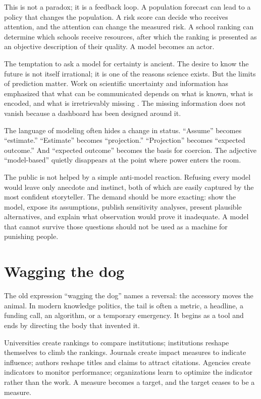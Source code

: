 ﻿\documentclass[12pt,a4paper]{book}
\begin{document}
This is not a paradox; it is a feedback loop. A population forecast can lead
to a policy that changes the population. A risk score can decide who receives
attention, and the attention can change the measured risk. A school ranking
can determine which schools receive resources, after which the ranking is
presented as an objective description of their quality. A model becomes an
actor.

The temptation to ask a model for certainty is ancient. The desire to know
the future is not itself irrational; it is one of the reasons science exists.
But the limits of prediction matter. Work on scientific uncertainty and
information has emphasized that what can be communicated depends on what is
known, what is encoded, and what is irretrievably missing
\cite{brillouin2}. The missing information does not vanish because a dashboard
has been designed around it.

The language of modeling often hides a change in status. ``Assume'' becomes
``estimate.'' ``Estimate'' becomes ``projection.'' ``Projection'' becomes
``expected outcome.'' And ``expected outcome'' becomes the basis for coercion.
The adjective ``model-based'' quietly disappears at the point where power
enters the room.

The public is not helped by a simple anti-model reaction. Refusing every model
would leave only anecdote and instinct, both of which are easily captured by
the most confident storyteller. The demand should be more exacting: show the
model, expose its assumptions, publish sensitivity analyses, present plausible
alternatives, and explain what observation would prove it inadequate. A model
that cannot survive those questions should not be used as a machine for
punishing people.

\section{Wagging the dog}

The old expression ``wagging the dog'' names a reversal: the accessory moves
the animal. In modern knowledge politics, the tail is often a metric, a
headline, a funding call, an algorithm, or a temporary emergency. It begins as
a tool and ends by directing the body that invented it.

Universities create rankings to compare institutions; institutions reshape
themselves to climb the rankings. Journals create impact measures to indicate
influence; authors reshape titles and claims to attract citations. Agencies
create indicators to monitor performance; organizations learn to optimize the
indicator rather than the work. A measure becomes a target, and the target
ceases to be a measure.
\end{document}
